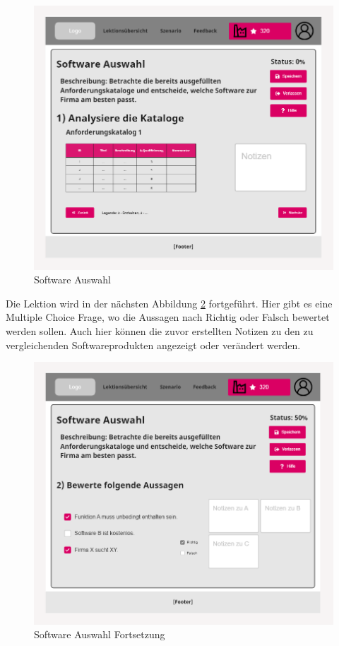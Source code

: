 \begin{figure}[H]
    \centering
    \includegraphics[width=1.0\textwidth]{assets/screenshots/mockups/Software-Auswahl-1.png}
    \caption{Software Auswahl}
    \label{fig:Software-Auswahl-1}
\end{figure}

Die Lektion wird in der nächsten Abbildung \ref{fig:Software-Auswahl-2} fortgeführt. Hier gibt es eine Multiple Choice Frage, wo die Aussagen nach Richtig oder Falsch bewertet werden sollen. Auch hier können die zuvor erstellten Notizen zu den zu vergleichenden Softwareprodukten angezeigt oder verändert werden.

\begin{figure}[H]
    \centering
    \includegraphics[width=1.0\textwidth]{assets/screenshots/mockups/Software-Auswahl-2.png}
    \caption{Software Auswahl Fortsetzung}
    \label{fig:Software-Auswahl-2}
\end{figure}

